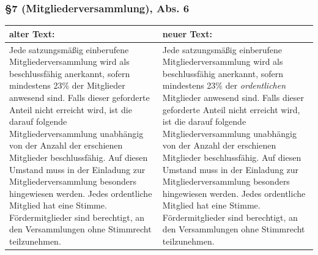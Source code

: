 \documentclass[a4paper,12pt]{scrartcl}
\begin{document}
\subsubsection*{§7 (Mitgliederversammlung), Abs. 6}
\begin{longtable}[c]{@{}ll@{}}
\toprule
\begin{minipage}[b]{0.47\columnwidth}\raggedright\strut
alter Text:
\strut\end{minipage} &
\begin{minipage}[b]{0.47\columnwidth}\raggedright\strut
neuer Text:
\strut\end{minipage}\tabularnewline
\midrule
\endhead
\begin{minipage}[t]{0.47\columnwidth}\raggedright\strut
Jede satzungsmäßig einberufene Mitgliederversammlung wird als
beschlussfähig anerkannt, sofern mindestens 23\% der Mitglieder anwesend
sind. Falls dieser geforderte Anteil nicht erreicht wird, ist die darauf
folgende Mitgliederversammlung unabhängig von der Anzahl der erschienen
Mitglieder beschlussfähig. Auf diesen Umstand muss in der Einladung zur
Mitgliederversammlung besonders hingewiesen werden. Jedes ordentliche
Mitglied hat eine Stimme. Fördermitglieder sind berechtigt, an den
Versammlungen ohne Stimmrecht teilzunehmen.
\strut\end{minipage} &
\begin{minipage}[t]{0.47\columnwidth}\raggedright\strut
Jede satzungsmäßig einberufene Mitgliederversammlung wird als
beschlussfähig anerkannt, sofern mindestens 23\% der \emph{ordentlichen}
Mitglieder anwesend sind. Falls dieser geforderte Anteil nicht erreicht
wird, ist die darauf folgende Mitgliederversammlung unabhängig von der
Anzahl der erschienen Mitglieder beschlussfähig. Auf diesen Umstand muss
in der Einladung zur Mitgliederversammlung besonders hingewiesen werden.
Jedes ordentliche Mitglied hat eine Stimme. Fördermitglieder sind
berechtigt, an den Versammlungen ohne Stimmrecht teilzunehmen.
\strut\end{minipage}\tabularnewline
\bottomrule
\end{longtable}
\end{document}
